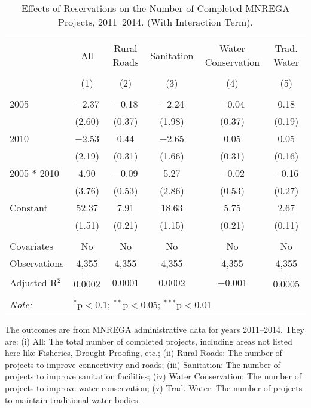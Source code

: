 \begin{table}[!htbp]
\centering
\begin{threeparttable}

  \caption{Effects of Reservations on the Number of Completed MNREGA Projects, 2011--2014. (With Interaction Term).} 
  \label{main_mnrega_interaction} 
\scriptsize 
\begin{tabular}{@{\extracolsep{0pt}}lccccc} 
\\[-1.8ex]\hline 
\hline \\[-1.8ex] 
 & All & Rural Roads & Sanitation & Water Conservation & Trad. Water \\ 
\\[-1.8ex] & (1) & (2) & (3) & (4) & (5)\\ 
\hline \\[-1.8ex] 
 2005 & $-$2.37 & $-$0.18 & $-$2.24 & $-$0.04 & 0.18 \\ 
  & (2.60) & (0.37) & (1.98) & (0.37) & (0.19) \\ 
  2010 & $-$2.53 & 0.44 & $-$2.65 & 0.05 & 0.05 \\ 
  & (2.19) & (0.31) & (1.66) & (0.31) & (0.16) \\ 
  2005 * 2010 & 4.90 & $-$0.09 & 5.27 & $-$0.02 & $-$0.16 \\ 
  & (3.76) & (0.53) & (2.86) & (0.53) & (0.27) \\ 
  Constant & 52.37 & 7.91 & 18.63 & 5.75 & 2.67 \\ 
  & (1.51) & (0.21) & (1.15) & (0.21) & (0.11) \\ 
 \hline \\[-1.8ex] 
Covariates & No & No & No & No & No \\ 
Observations & 4,355 & 4,355 & 4,355 & 4,355 & 4,355 \\ 
Adjusted R$^{2}$ & $-$0.0002 & 0.0001 & 0.0002 & $-$0.001 & $-$0.0005 \\ 
\hline 
\hline \\[-1.8ex] 
\textit{Note:}  & \multicolumn{5}{l}{$^{*}$p$<$0.1; $^{**}$p$<$0.05; $^{***}$p$<$0.01} \\ 
\end{tabular} 
\begin{tablenotes}[flushleft]
\scriptsize
\item The outcomes are from MNREGA administrative data for years 2011--2014. They are: 
(i) All: The total number of completed projects, including areas not listed here like Fisheries, Drought Proofing, etc.;
(ii) Rural Roads: The number of projects to improve connectivity and roads;
(iii) Sanitation: The number of projects to improve sanitation facilities;
(iv) Water Conservation: The number of projects to improve water conservation;
(v) Trad. Water: The number of projects to maintain traditional water bodies.
\end{tablenotes}
\end{threeparttable}
\end{table}
